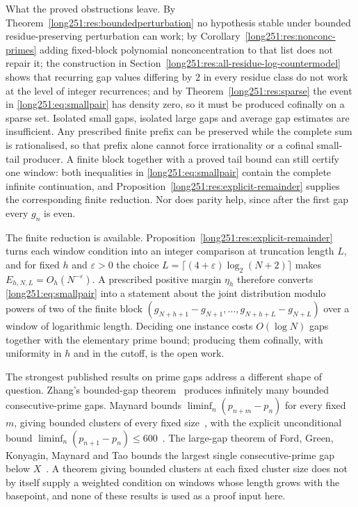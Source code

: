 \documentclass[11pt]{article}
\begin{document}
What the proved obstructions leave.  By Theorem~\ref{long251:res:boundedperturbation}
no hypothesis stable under bounded residue-preserving perturbation can work;
by Corollary~\ref{long251:res:nonconc-primes} adding fixed-block polynomial
nonconcentration to that list does not repair it; the construction in
Section~\ref{long251:res:all-residue-log-countermodel} shows that recurring gap
values differing by $2$ in every residue class do not work at the level of
integer recurrences; and by
Theorem~\ref{long251:res:sparse} the event in \eqref{long251:eq:smallpair} has density zero, so
it must be produced cofinally on a sparse set.  Isolated small gaps, isolated
large gaps and average gap estimates are insufficient.  Any prescribed finite
prefix can be preserved while the complete sum is rationalised, so that prefix
alone cannot force irrationality or a cofinal small-tail producer.  A finite
block together with a proved tail bound can still certify one window: both
inequalities in \eqref{long251:eq:smallpair} contain the complete infinite
continuation, and Proposition~\ref{long251:res:explicit-remainder} supplies the
corresponding finite reduction.  Nor does
parity help, since after the first gap every $g_n$ is even.

The finite reduction is available.  Proposition~\ref{long251:res:explicit-remainder}
turns each window condition into an integer comparison at truncation length
$L$, and for fixed $h$ and $\varepsilon>0$ the choice
$L=\lceil(4+\varepsilon)\log_2(N+2)\rceil$ makes $E_{h,N,L}=O_h(N^{-\varepsilon})$.
A prescribed positive margin $\eta_h$ therefore converts \eqref{long251:eq:smallpair}
into a statement about the joint distribution modulo powers of two of the
finite block $(g_{N+h+1}-g_{N+1},\ldots,g_{N+h+L}-g_{N+L})$ over a window of
logarithmic length.  Deciding one instance costs $O(\log N)$ gaps together with
the elementary prime bound; producing them cofinally, with uniformity in $h$
and in the cutoff, is the open work.

The strongest published results on prime gaps address a different shape of
question.  Zhang's bounded-gap theorem~\cite[Theorem~1, p.~1122]{zhang2014}
produces infinitely many bounded consecutive-prime gaps.  Maynard bounds
$\liminf_n(p_{n+m}-p_n)$ for every fixed $m$, giving bounded clusters of every
fixed size~\cite[Theorem~1.1, p.~384]{maynard2015}, with the explicit
unconditional bound $\liminf_n(p_{n+1}-p_n)\le600$~\cite[Theorem~1.3,
p.~385]{maynard2015}.  The large-gap theorem of Ford, Green, Konyagin, Maynard
and Tao bounds the largest single consecutive-prime gap below
$X$~\cite[Theorem~1, p.~66]{fgkmt2018}.  A theorem giving bounded clusters at
each fixed cluster size does not by itself supply a weighted condition on
windows whose length grows with the basepoint, and none of these results is
used as a proof input here.
\end{document}
